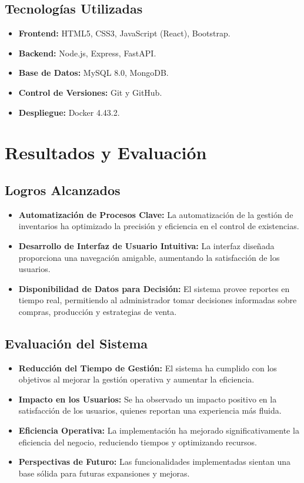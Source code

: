 \documentclass[conference]{IEEEtran}
\begin{document}
\subsection{Tecnologías Utilizadas}
\begin{itemize}
    \item \textbf{Frontend:} HTML5, CSS3, JavaScript (React), Bootstrap.
    \item \textbf{Backend:} Node.js, Express, FastAPI.
    \item \textbf{Base de Datos:} MySQL 8.0, MongoDB.
    \item \textbf{Control de Versiones:} Git y GitHub.
    \item \textbf{Despliegue:} Docker 4.43.2.
\end{itemize}

\section{Resultados y Evaluación}
\subsection{Logros Alcanzados}
\begin{itemize}
    \item \textbf{Automatización de Procesos Clave:} La automatización de la gestión de inventarios ha optimizado la precisión y eficiencia en el control de existencias.
    \item \textbf{Desarrollo de Interfaz de Usuario Intuitiva:} La interfaz diseñada proporciona una navegación amigable, aumentando la satisfacción de los usuarios.
    \item \textbf{Disponibilidad de Datos para Decisión:} El sistema provee reportes en tiempo real, permitiendo al administrador tomar decisiones informadas sobre compras, producción y estrategias de venta.
\end{itemize}

\subsection{Evaluación del Sistema}
\begin{itemize}
    \item \textbf{Reducción del Tiempo de Gestión:} El sistema ha cumplido con los objetivos al mejorar la gestión operativa y aumentar la eficiencia.
    \item \textbf{Impacto en los Usuarios:} Se ha observado un impacto positivo en la satisfacción de los usuarios, quienes reportan una experiencia más fluida.
    \item \textbf{Eficiencia Operativa:} La implementación ha mejorado significativamente la eficiencia del negocio, reduciendo tiempos y optimizando recursos.
    \item \textbf{Perspectivas de Futuro:} Las funcionalidades implementadas sientan una base sólida para futuras expansiones y mejoras.
\end{itemize}
\end{document}
